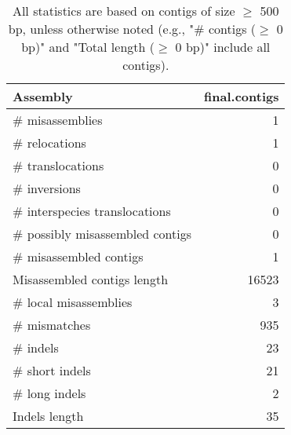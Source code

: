 \documentclass[12pt,a4paper]{article}
\begin{document}
\begin{table}[ht]
\begin{center}
\caption{All statistics are based on contigs of size $\geq$ 500 bp, unless otherwise noted (e.g., "\# contigs ($\geq$ 0 bp)" and "Total length ($\geq$ 0 bp)" include all contigs).}
\begin{tabular}{|l*{1}{|r}|}
\hline
Assembly & final.contigs \\ \hline
\# misassemblies & 1 \\ \hline
\hspace{5mm}\# relocations & 1 \\ \hline
\hspace{5mm}\# translocations & 0 \\ \hline
\hspace{5mm}\# inversions & 0 \\ \hline
\hspace{5mm}\# interspecies translocations & 0 \\ \hline
\# possibly misassembled contigs & 0 \\ \hline
\# misassembled contigs & 1 \\ \hline
Misassembled contigs length & 16523 \\ \hline
\# local misassemblies & 3 \\ \hline
\# mismatches & 935 \\ \hline
\# indels & 23 \\ \hline
\hspace{5mm}\# short indels & 21 \\ \hline
\hspace{5mm}\# long indels & 2 \\ \hline
Indels length & 35 \\ \hline
\end{tabular}
\end{center}
\end{table}
\end{document}
